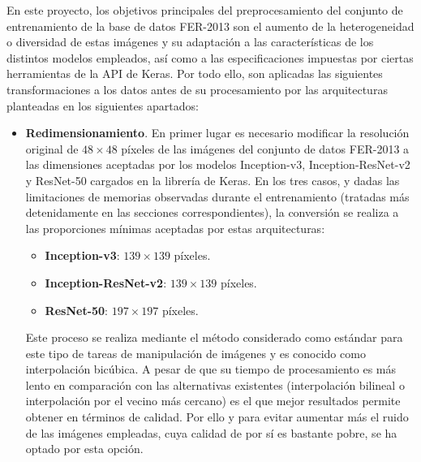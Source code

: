 En este proyecto, los objetivos principales del preprocesamiento del conjunto de entrenamiento de la base de datos FER-2013 son el aumento de la heterogeneidad o diversidad de estas imágenes y su adaptación a las características de los distintos modelos empleados, así como a las especificaciones impuestas por ciertas herramientas de la API de Keras. Por todo ello, son aplicadas las siguientes transformaciones a los datos antes de su procesamiento por las arquitecturas planteadas en los siguientes apartados:
\begin{itemize}
  \item \textbf{Redimensionamiento}. En primer lugar es necesario modificar la resolución original de $48\times 48$ píxeles de las imágenes del conjunto de datos FER-2013 a las dimensiones aceptadas por los modelos Inception-v3, Inception-ResNet-v2 y ResNet-50 cargados en la librería de Keras. En los tres casos, y dadas las limitaciones de memorias observadas durante el entrenamiento (tratadas más detenidamente en las secciones correspondientes), la conversión se realiza a las proporciones mínimas aceptadas por estas arquitecturas:
        \begin{itemize}
          \item \textbf{Inception-v3}: $139\times 139$ píxeles.
          \item \textbf{Inception-ResNet-v2}: $139\times 139$ píxeles.
          \item \textbf{ResNet-50}: $197\times 197$ píxeles.
        \end{itemize}

  Este proceso se realiza mediante el método considerado como estándar para este tipo de tareas de manipulación de imágenes y es conocido como interpolación bicúbica. A pesar de que su tiempo de procesamiento es más lento en comparación con las alternativas existentes (interpolación bilineal o interpolación por el vecino más cercano) es el que mejor resultados permite obtener en términos de calidad. Por ello y para evitar aumentar más el ruido de las imágenes empleadas, cuya calidad de por sí es bastante pobre, se ha optado por esta opción.
  

\end{itemize}
